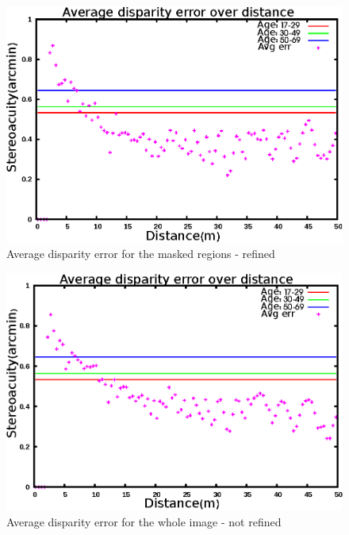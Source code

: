 \begin{figure}[H]
\centering
\includegraphics[scale=0.8]{adcenmsk3}
\caption{Average disparity error for the masked regions - refined}
\label{fig:adcm3}
\end{figure} 

\begin{figure}[H]
\centering
\includegraphics[scale=0.8]{adcenfull3NoLR}
\caption{Average disparity error for the whole image - not refined}
\label{fig:adcfnoLR}
\end{figure} 

